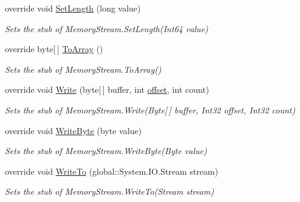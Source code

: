 \begin{DoxyCompactItemize}
override void \hyperlink{class_system_1_1_i_o_1_1_fakes_1_1_stub_memory_stream_a954669c367ff958a6b558d9f538730fe}{Set\-Length} (long value)
\begin{DoxyCompactList}\small\item\em Sets the stub of Memory\-Stream.\-Set\-Length(\-Int64 value)\end{DoxyCompactList}\item 
override byte\mbox{[}$\,$\mbox{]} \hyperlink{class_system_1_1_i_o_1_1_fakes_1_1_stub_memory_stream_a5f276651f8a94a7426ea55a31fcf19f0}{To\-Array} ()
\begin{DoxyCompactList}\small\item\em Sets the stub of Memory\-Stream.\-To\-Array()\end{DoxyCompactList}\item 
override void \hyperlink{class_system_1_1_i_o_1_1_fakes_1_1_stub_memory_stream_a307f9c89804d212c1d22a7bb4113ba49}{Write} (byte\mbox{[}$\,$\mbox{]} buffer, int \hyperlink{jquery-1_810_82_8js_a4a9f594d20d927164551fc7fa4751a2f}{offset}, int count)
\begin{DoxyCompactList}\small\item\em Sets the stub of Memory\-Stream.\-Write(\-Byte\mbox{[}$\,$\mbox{]} buffer, Int32 offset, Int32 count)\end{DoxyCompactList}\item 
override void \hyperlink{class_system_1_1_i_o_1_1_fakes_1_1_stub_memory_stream_ae52693c4f805b87301ba84bd83249fbc}{Write\-Byte} (byte value)
\begin{DoxyCompactList}\small\item\em Sets the stub of Memory\-Stream.\-Write\-Byte(\-Byte value)\end{DoxyCompactList}\item 
override void \hyperlink{class_system_1_1_i_o_1_1_fakes_1_1_stub_memory_stream_a206f8fac72dc9732ecb7af1aff919cc9}{Write\-To} (global\-::\-System.\-I\-O.\-Stream stream)
\begin{DoxyCompactList}\small\item\em Sets the stub of Memory\-Stream.\-Write\-To(\-Stream stream)\end{DoxyCompactList}\end{DoxyCompactItemize}
